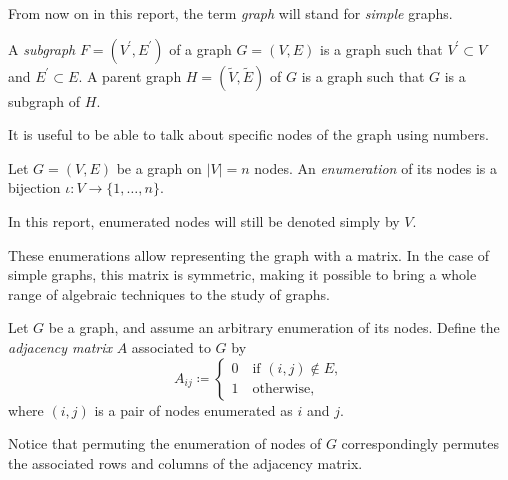 \documentclass[../../main.tex]{subfiles} %
\begin{document}
\begin{remark}
	From now on in this report, the term \textit{graph} will stand for 
	\textit{simple} graphs.
\end{remark}

\begin{definition}
	A \textit{subgraph} \(F=(V^\prime, E^\prime)\) of a graph \(G=(V, E)\) is 
	a 
	graph such that \(V^\prime \subset V\) and \(E^\prime \subset E\). A 
	parent graph \(H=(\tilde V, \tilde E)\) of \(G\) is a graph such that \(G\) 
	is a 
	subgraph of \(H\).
\end{definition}

It is useful to be able to talk about specific nodes of the graph using 
numbers.
\begin{definition}
	Let \(G=(V, E)\) be a graph on \(\vert V \vert = n\) nodes. An 
	\textit{enumeration} of its nodes is a bijection \(\iota: V \to \{1, \dots, 
	n\}\).
\end{definition}
\begin{remark}
	In this report, enumerated nodes will still be denoted simply by \(V\).
\end{remark}

These enumerations allow representing the graph with a matrix. In the case 
of 
simple graphs, this matrix is symmetric, making it possible to bring a whole 
range of algebraic techniques to the study of graphs.
\begin{definition}
	Let \(G\) be a graph, and assume an arbitrary enumeration of its nodes. 
	Define the \textit{adjacency matrix} \(A\) associated to \(G\) by
	\begin{equation}
		A_{ij} \coloneqq \begin{cases}
			0 \quad \text{if } (i, j) \not \in E, \\
			1 \quad \text{otherwise},
		\end{cases}
	\end{equation}
	where \((i, j)\) is a pair of nodes enumerated as \(i\) and \(j\).
\end{definition}
\begin{remark}
	Notice that permuting the enumeration of nodes of \(G\) correspondingly 
	permutes the associated rows and columns of the adjacency matrix.
\end{remark}
\end{document}

